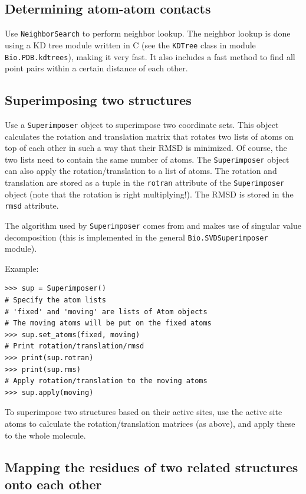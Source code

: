 \subsection{Determining atom-atom contacts}

Use \texttt{NeighborSearch} to perform neighbor lookup.
The neighbor lookup is done using a KD tree module written in C (see the \texttt{KDTree} class in module \texttt{Bio.PDB.kdtrees}), making it very fast.
It also includes a fast method to find all point pairs within a certain distance of each other.

\subsection{Superimposing two structures}

Use a \texttt{Superimposer} object to superimpose two coordinate sets.
This object calculates the rotation and translation matrix that rotates
two lists of atoms on top of each other in such a way that their RMSD
is minimized. Of course, the two lists need to contain the same number
of atoms. The \texttt{Superimposer} object can also apply the rotation/translation
to a list of atoms. The rotation and translation are stored as a tuple
in the \texttt{rotran} attribute of the \texttt{Superimposer} object
(note that the rotation is right multiplying!). The RMSD is stored
in the \texttt{rmsd} attribute.

The algorithm used by \texttt{Superimposer} comes from \cite[Golub \& Van Loan]{golub1989} and makes use of singular value decomposition (this is implemented in the general \texttt{Bio.SVDSuperimposer} module).

Example:

\begin{verbatim}
>>> sup = Superimposer()
# Specify the atom lists
# 'fixed' and 'moving' are lists of Atom objects
# The moving atoms will be put on the fixed atoms
>>> sup.set_atoms(fixed, moving)
# Print rotation/translation/rmsd
>>> print(sup.rotran)
>>> print(sup.rms)
# Apply rotation/translation to the moving atoms
>>> sup.apply(moving)
\end{verbatim}

To superimpose two structures based on their active sites, use the active site atoms to calculate the rotation/translation matrices (as above), and apply these to the whole molecule.

\subsection{Mapping the residues of two related structures onto each other}

